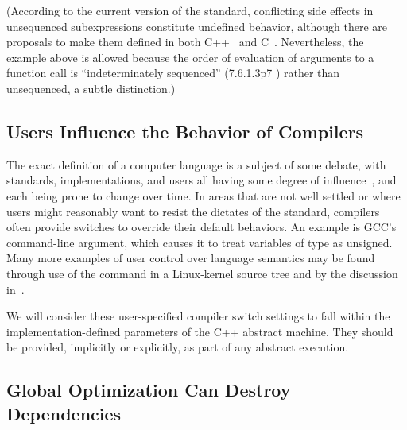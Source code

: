 (According to the current version of the standard, conflicting side effects
in unsequenced subexpressions constitute undefined behavior,
although there are proposals to make them defined in both
C++~\cite{GabrielDosReis2016P0145r3}
and C~\cite{AlexCeleste2023N3203}.
Nevertheless, the example above is allowed because the order of evaluation
of arguments to a function call is ``indeterminately sequenced''
(7.6.1.3p7 ) rather than unsequenced, a subtle distinction.)

\subsection{Users Influence the Behavior of Compilers}
\label{sec:Users Influence the Behavior of Compilers}

The exact definition of a computer language is a subject of some debate,
with standards, implementations, and users all having some degree of
influence~\cite{KayvanMemarian2016DepthOfC-1,KayvanMemarian2016DepthOfC-2},
and each being prone to change over time.
In areas that are not well settled or where users might reasonably
want to resist the dictates of the standard,
compilers often provide switches to override their default behaviors.
An example is GCC's  command-line argument,
which causes it to treat variables of type  as unsigned.
Many more examples of user control over language semantics
may be found through use of the command 
in a Linux-kernel source tree and by the discussion
in~\cite{KayvanMemarian2016DepthOfC-1,KayvanMemarian2016DepthOfC-2}.

We will consider these user-specified compiler switch settings to fall
within the implementation-defined parameters of the C++ abstract machine.
They should be provided, implicitly or explicitly, as part of any
abstract execution.

\subsection{Global Optimization Can Destroy Dependencies}
\label{sec:Global Optimization Can Destroy Dependencies}

